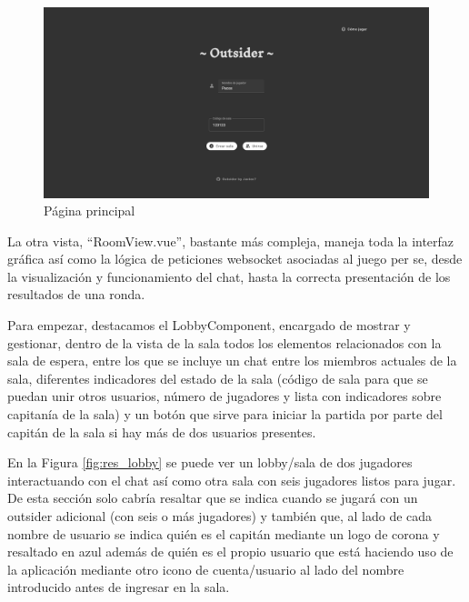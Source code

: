 \begin{figure}[h]
	\centering
	\includegraphics[width=\textwidth,clip=true]{res_mainpage.png}
	\caption{Página principal}
	\label{fig:res_mainpage}
\end{figure}

La otra vista, ``RoomView.vue'', bastante más compleja, maneja toda la interfaz gráfica así como la lógica de peticiones websocket asociadas al juego per se, desde la
visualización y funcionamiento del chat, hasta la correcta presentación de los resultados de una ronda.

Para empezar, destacamos el LobbyComponent, encargado de mostrar y gestionar, dentro de la vista de la sala todos los elementos relacionados con la sala de espera, entre los que se
incluye un chat entre los miembros actuales de la sala, diferentes indicadores del estado de la sala (código de sala para que se puedan unir otros usuarios, número de jugadores y
lista con indicadores sobre capitanía de la sala) y un botón que sirve para iniciar la partida por parte del capitán de la sala si hay más de dos usuarios presentes.

En la Figura \ref{fig:res_lobby} se puede ver un lobby/sala de dos jugadores interactuando con el chat así como otra sala con seis jugadores listos para jugar. De esta sección solo
cabría resaltar que se indica cuando se jugará con un outsider adicional (con seis o más jugadores) y también que, al lado de cada nombre de usuario se indica quién es el capitán mediante
un logo de corona y resaltado en azul además de quién es el propio usuario que está haciendo uso de la aplicación mediante otro icono de cuenta/usuario al lado del nombre introducido
antes de ingresar en la sala.

